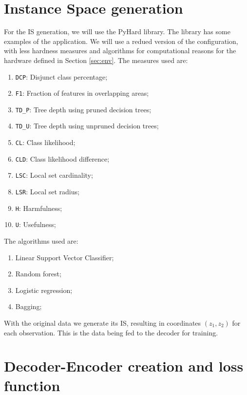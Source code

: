 \section{Instance Space generation}

For the IS generation, we will use the PyHard \cite{Lorena2022} library. The library has some examples of the application. We will use a redued version of the configuration, with less hardness measures and algorithms for computational reasons for the hardware defined in Section \ref{sec:env}. The measures used are:

\begin{enumerate}
    \item \texttt{DCP}: Disjunct class percentage;
    \item \texttt{F1}: Fraction of features in overlapping areas;
    \item \texttt{TD\_P}: Tree depth using pruned decision trees;
    \item \texttt{TD\_U}: Tree depth using unpruned decision trees;
    \item \texttt{CL}: Class likelihood;
    \item \texttt{CLD}: Class likelihood difference;
    \item \texttt{LSC}: Local set cardinality;
    \item \texttt{LSR}: Local set radius;
    \item \texttt{H}: Harmfulness;
    \item \texttt{U}: Usefulness;
\end{enumerate}

The algorithms used are:

\begin{enumerate}
    \item Linear Support Vector Classifier;
    \item Random forest;
    \item Logistic regression;
    \item Bagging;
\end{enumerate}

With the original data we generate its IS, resulting in coordinates $(z_1, z_2)$ for each observation. This is the data being fed to the decoder for training.

\section{Decoder-Encoder creation and loss function}

